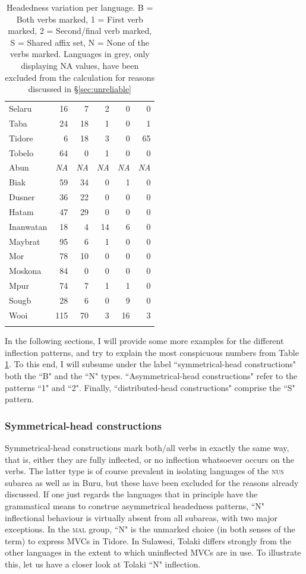 \begin{table}
\begin{tabular}{lrrrrr}
  Selaru &  16 &   7 &   2 &   0 &   0 \tabularnewline 
  Taba &  24 &  18 &   1 &   0 &   1 \tabularnewline 
  Tidore & 6 & 18 & 3 & 0 & 65 \tabularnewline
  Tobelo &  64 &   0 &   1 &   0 &   0 \tabularnewline \midrule 
  {\color{gray}Abun} & {\color{gray}\textit{NA}} & {\color{gray}\textit{NA}} & {\color{gray}\textit{NA}} &   {\color{gray}\textit{NA}} & {\color{gray}\textit{NA}} \tabularnewline
  Biak &  59 &  34 &   0 &   1 &   0 \tabularnewline
  Dusner &  36 &  22 &   0 &   0 &   0 \tabularnewline
  Hatam &  47 &  29 &   0 &   0 &   0 \tabularnewline
  Inanwatan &  18 &   4 &  14 &   6 &   0 \tabularnewline
  Maybrat &  95 &   6 &   1 &   0 &   0 \tabularnewline 
  Mor &  78 &  10 &   0 &   0 &   0 \tabularnewline
  Moskona &  84 &   0 &   0 &   0 &   0 \tabularnewline
  Mpur &  74 &   7 &   1 &   1 &   0 \tabularnewline
  Sougb &  28 &   6 &   0 &   9 &   0 \tabularnewline 
  Wooi & 115 &  70 &   3 &  16 &   3 \tabularnewline
   \lspbottomrule
\end{tabular}
\caption[Headedness variation per language]{Headedness variation per language. B = Both verbs marked, 1 = First verb marked, 2 = Second/final verb marked, S = Shared affix set, N = None of the verbs marked. Languages in grey, only displaying \textsc{NA} values, have been excluded from the calculation for reasons discussed in §\ref{sec:unreliable}}
\label{table:Headedness_per_lang}
\end{table}

In the following sections, I will provide some more examples for the different inflection patterns, and try to explain the most conspicuous numbers from Table \ref{table:Headedness_per_lang}. To this end, I will subsume under the label ``symmetrical-head constructions" both the ``B" and the ``N" types. ``Asymmetrical-head constructions" refer to the patterns ``1" and ``2". Finally, ``distributed-head constructions" comprise the ``S" pattern.

\subsubsection{Symmetrical-head constructions}\label{sec:symmetrical-head}

Symmetrical-head constructions mark both/all verbs in exactly the same way, that is, either they are fully inflected, or no inflection whatsoever occurs on the verbs. The latter type is of course prevalent in isolating languages of the \textsc{nus} subarea as well as in Buru, but these have been excluded for the reasons already discussed. If one just regards the languages that in principle have the grammatical means to construe asymmetrical headedness patterns, ``N" inflectional behaviour is virtually absent from all subareas, with two major exceptions. In the \textsc{mal} group, ``N" is the unmarked choice (in both senses of the term) to express MVCs in Tidore. In Sulawesi, Tolaki differs strongly from the other languages in the extent to which uninflected MVCs are in use. To illustrate this, let us have a closer look at Tolaki ``N" inflection.

